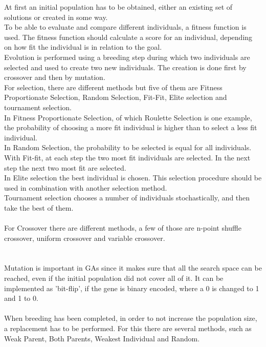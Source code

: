 At first an initial population has to be obtained, either an existing set of solutions or created in some way.\\
To be able to evaluate and compare different individuals, a fitness function is used. The fitness function should calculate a score for an individual, depending on how fit the individual is in relation to the goal.\\
Evolution is performed using a breeding step during which two individuals are selected and used to create two new individuals. The creation is done first by crossover and then by mutation.\\
For selection, there are different methods but five of them are Fitness Proportionate Selection, Random Selection, Fit-Fit, Elite selection and tournament selection.\\
In Fitness Proportionate Selection, of which Roulette Selection is one example, the probability of choosing a more fit individual is higher than to select a less fit individual.\\
In Random Selection, the probability to be selected is equal for all individuals. \\
With Fit-fit, at each step the two most fit individuals are selected. In the next step the next two most fit are selected.\\
In Elite selection the best individual is chosen. This selection procedure should be used in combination with another selection method.\\
Tournament selection chooses a number of individuals stochastically, and then take the best of them.\\
\\
For Crossover there are different methods, a few of those are n-point shuffle crossover, uniform crossover and variable crossover.\\
\\
\\Mutation is important in GAs since it makes sure that all the search space can be reached, even if the initial population did not cover all of it. It can be implemented as 'bit-flip', if the gene is binary encoded, where a 0 is changed to 1 and 1 to 0.\\
\\
When breeding has been completed, in order to not increase the population size, a replacement has to be performed. For this there are several methods, such as Weak Parent, Both Parents, Weakest Individual and Random.\\
